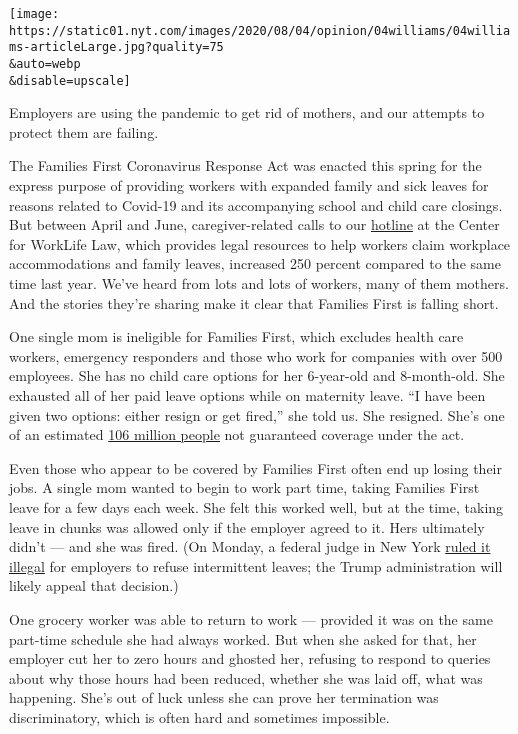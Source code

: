 \texttt{[image: https://static01.nyt.com/images/2020/08/04/opinion/04williams/04williams-articleLarge.jpg?quality=75\\\&auto=webp\\\&disable=upscale]}

Employers are using the pandemic to get rid of mothers, and our attempts
to protect them are failing.

The Families First Coronavirus Response Act was enacted this spring for
the express purpose of providing workers with expanded family and sick
leaves for reasons related to Covid-19 and its accompanying school and
child care closings. But between April and June, caregiver-related calls
to our \href{https://worklifelaw.org/covid19/}{hotline} at the Center
for WorkLife Law, which provides legal resources to help workers claim
workplace accommodations and family leaves, increased 250 percent
compared to the same time last year. We've heard from lots and lots of
workers, many of them mothers. And the stories they're sharing make it
clear that Families First is falling short.

One single mom is ineligible for Families First, which excludes health
care workers, emergency responders and those who work for companies with
over 500 employees. She has no child care options for her 6-year-old and
8-month-old. She exhausted all of her paid leave options while on
maternity leave. ``I have been given two options: either resign or get
fired,'' she told us. She resigned. She's one of an estimated
\href{https://www.americanprogress.org/issues/economy/news/2020/04/17/483287/coronavirus-paid-leave-exemptions-exclude-millions-workers-coverage/}{106
million people} not guaranteed coverage under the act.

Even those who appear to be covered by Families First often end up
losing their jobs. A single mom wanted to begin to work part time,
taking Families First leave for a few days each week. She felt this
worked well, but at the time, taking leave in chunks was allowed only if
the employer agreed to it. Hers ultimately didn't --- and she was fired.
(On Monday, a federal judge in New York
\href{https://www.law360.com/employment/articles/1297787}{ruled it
illegal} for employers to refuse intermittent leaves; the Trump
administration will likely appeal that decision.)

One grocery worker was able to return to work --- provided it was on the
same part-time schedule she had always worked. But when she asked for
that, her employer cut her to zero hours and ghosted her, refusing to
respond to queries about why those hours had been reduced, whether she
was laid off, what was happening. She's out of luck unless she can prove
her termination was discriminatory, which is often hard and sometimes
impossible.

